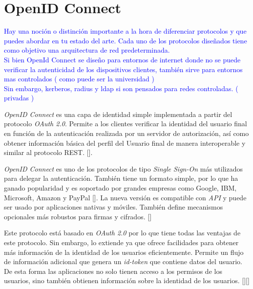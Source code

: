 \section{OpenID Connect}
\textcolor{blue}{Hay una noción o distinción importante a la hora de diferenciar protocolos y que puedes abordar en tu estado del arte. Cada uno de los protocolos diseñados tiene como objetivo una arquitectura de red predeterminada. \\
Si bien OpenId Connect se diseño para entornos de internet donde no se puede verificar la autenticidad de los dispositivos clientes, también sirve para entornos mas controlados ( como puede ser la universidad )\\
Sin embargo, kerberos, radius y ldap si son pensados para redes controladas. ( privadas )}


\textit{OpenID Connect} es una capa de identidad simple implementada a partir del protocolo \textit{OAuth 2.0}. Permite a los clientes verificar la identidad del usuario final en función de la autenticación realizada por un servidor de autorización, así como obtener información básica del perfil del Usuario final de manera interoperable y similar al protocolo REST. [\cite{openid-doc}]. 

\textit{OpenID Connect }es uno de los protocolos de tipo \textit{Single Sign-On} más utilizados para delegar la autenticación. También tiene un formato simple, por lo que ha ganado popularidad y es soportado por grandes empresas como Google, IBM, Microsoft, Amazon y PayPal [\cite{mainka2017sok}]. La nueva versión es compatible con \textit{API} y puede ser usado por aplicaciones nativas y móviles. También define mecanismos opcionales más robustos para firmas y cifrados. [\cite{openid-doc}]

Este protocolo está basado en \textit{OAuth 2.0} por lo que tiene todas las ventajas de este protocolo. Sin embargo, lo extiende ya que ofrece facilidades para obtener más información de la identidad de los usuarios eficientemente. Permite un flujo de información adicional que genera un \textit{id-token} que contiene datos del usuario. De esta forma las aplicaciones no solo tienen acceso a los permisos de los usuarios, sino también obtienen información sobre la identidad de los usuarios.  [\cite{openid-doc}][\cite{kutera2016single}]


